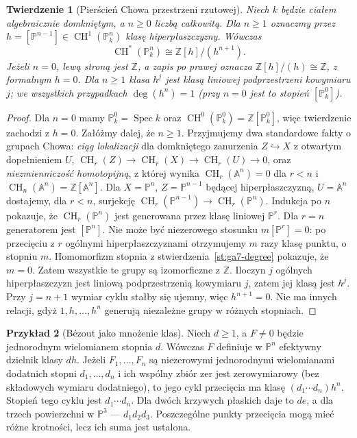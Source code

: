\documentclass[11pt,a4paper,openany]{report}
\numberwithin{equation}{section}
\theoremstyle{plain}
\newtheorem{twierdzenie}{Twierdzenie}[section]
\theoremstyle{definition}
\newtheorem{przyklad}[twierdzenie]{Przykład}
\theoremstyle{remark}
\newcommand{\Z}{\mathbb Z}
\newcommand{\A}{\mathbb A}
\newcommand{\PP}{\mathbb P}
\newcommand{\Spec}{\operatorname{Spec}}
\begin{document}
\begin{twierdzenie}[Pierścień Chowa przestrzeni rzutowej]
\label{tw:ga7-chow-pn}
Niech $k$ będzie ciałem algebraicznie domkniętym,
a $n\ge0$ liczbą całkowitą. Dla $n\ge1$ oznaczmy
przez $h=[\PP^{n-1}]\in\operatorname{CH}^1(\PP^n_k)$
klasę hiperpłaszczyzny. Wówczas
\[
\operatorname{CH}^*(\PP^n_k)\cong\Z[h]/(h^{n+1}).
\]
Jeżeli $n=0$, lewą stroną jest $\Z$, a zapis po prawej
oznacza $\Z[h]/(h)\cong\Z$, z formalnym $h=0$.
Dla $n\ge1$ klasa $h^j$ jest klasą liniowej podprzestrzeni
kowymiaru $j$; we wszystkich przypadkach $\deg(h^n)=1$
(przy $n=0$ jest to stopień $[\PP^0_k]$).
\end{twierdzenie}
\begin{proof}
Dla $n=0$ mamy $\PP^0_k=\Spec k$ oraz
$\operatorname{CH}^0(\PP^0_k)=\Z[\PP^0_k]$,
więc twierdzenie zachodzi z $h=0$.
Załóżmy dalej, że $n\ge1$.
Przyjmujemy dwa standardowe fakty o grupach Chowa:
\emph{ciąg lokalizacji} dla domkniętego zanurzenia
$Z\hookrightarrow X$ z otwartym dopełnieniem $U$,
$\operatorname{CH}_r(Z)\to\operatorname{CH}_r(X)
\to\operatorname{CH}_r(U)\to0$, oraz
\emph{niezmienniczość homotopijną}, z której wynika
$\operatorname{CH}_r(\A^n)=0$ dla $r<n$ i
$\operatorname{CH}_n(\A^n)=\Z[\A^n]$.
Dla $X=\PP^n$, $Z=\PP^{n-1}$ będącej hiperpłaszczyzną,
$U=\A^n$ dostajemy, dla $r<n$, surjekcję
$\operatorname{CH}_r(\PP^{n-1})\to\operatorname{CH}_r(\PP^n)$.
Indukcja po $n$ pokazuje, że $\operatorname{CH}_r(\PP^n)$
jest generowana przez klasę liniowej $\PP^r$.
Dla $r=n$ generatorem jest $[\PP^n]$.
Nie może być niezerowego stosunku $m[\PP^r]=0$:
po przecięciu z $r$ ogólnymi hiperpłaszczyznami otrzymujemy
$m$ razy klasę punktu, o stopniu $m$.
Homomorfizm stopnia z
stwierdzenia~\ref{st:ga7-degree} pokazuje, że $m=0$.
Zatem wszystkie te grupy są izomorficzne z $\Z$.
Iloczyn $j$ ogólnych hiperpłaszczyzn jest liniową
podprzestrzenią kowymiaru $j$, zatem jej klasą jest $h^j$.
Przy $j=n+1$ wymiar cyklu stałby się ujemny, więc
$h^{n+1}=0$. Nie ma innych relacji, gdyż
$1,h,\ldots,h^n$ generują niezależne grupy
w różnych stopniach.
\end{proof}

\begin{przyklad}[Bézout jako mnożenie klas]
\label{prz:ga7-bezout}
Niech $d\ge1$, a $F\ne0$ będzie jednorodnym
wielomianem stopnia $d$. Wówczas $F$ definiuje
w $\PP^n$ efektywny dzielnik klasy $dh$.
Jeżeli $F_1,\ldots,F_n$ są niezerowymi jednorodnymi
wielomianami dodatnich stopni $d_1,\ldots,d_n$
i ich wspólny zbiór zer jest zerowymiarowy (bez składowych
wymiaru dodatniego), to jego cykl przecięcia ma klasę
$(d_1\cdots d_n)h^n$. Stopień tego cyklu jest
$d_1\cdots d_n$. Dla dwóch krzywych płaskich daje to
$de$, a dla trzech powierzchni w $\PP^3$ --- $d_1d_2d_3$.
Poszczególne punkty przecięcia mogą mieć różne krotności,
lecz ich suma jest ustalona.
\end{przyklad}
\end{document}
